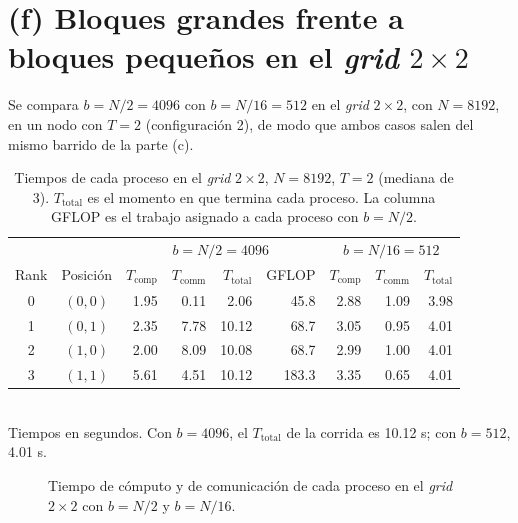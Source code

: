 \documentclass[11pt,a4paper]{article}
\newcommand{\Tcomp}{T_{\text{comp}}}
\newcommand{\Tcomm}{T_{\text{comm}}}
\newcommand{\Ttot}{T_{\text{total}}}
\begin{document}
\section{(f) Bloques grandes frente a bloques pequeños en el \emph{grid} $2\times2$}
Se compara $b=N/2=4096$ con $b=N/16=512$ en el \emph{grid} $2\times2$, con $N=8192$, en un nodo con $T=2$ (configuración 2), de modo que ambos casos salen del mismo barrido de la parte (c).

\begin{table}[H]
\centering\small
\caption{Tiempos de cada proceso en el \emph{grid} $2\times2$, $N=8192$, $T=2$ (mediana de 3). $\Ttot$ es el momento en que termina cada proceso. La columna GFLOP es el trabajo asignado a cada proceso con $b=N/2$.}
\label{tab:f}
\begin{tabular}{cc|rrrr|rrr}
\toprule
 & & \multicolumn{4}{c|}{$b=N/2=4096$} & \multicolumn{3}{c}{$b=N/16=512$} \\
Rank & Posición & $\Tcomp$ & $\Tcomm$ & $\Ttot$ & GFLOP & $\Tcomp$ & $\Tcomm$ & $\Ttot$ \\
\midrule
0 & $(0,0)$ & 1.95 & 0.11 & 2.06 & 45.8 & 2.88 & 1.09 & 3.98 \\
1 & $(0,1)$ & 2.35 & 7.78 & 10.12 & 68.7 & 3.05 & 0.95 & 4.01 \\
2 & $(1,0)$ & 2.00 & 8.09 & 10.08 & 68.7 & 2.99 & 1.00 & 4.01 \\
3 & $(1,1)$ & 5.61 & 4.51 & 10.12 & 183.3 & 3.35 & 0.65 & 4.01 \\
\bottomrule
\end{tabular}\\[2pt]
{\footnotesize Tiempos en segundos. Con $b=4096$, el $\Ttot$ de la corrida es 10.12 s; con $b=512$, 4.01 s.}
\end{table}

\begin{figure}[H]\centering
{}
\caption{Tiempo de cómputo y de comunicación de cada proceso en el \emph{grid} $2\times2$ con $b=N/2$ y $b=N/16$.}
\label{fig:f}
\end{figure}
\end{document}
